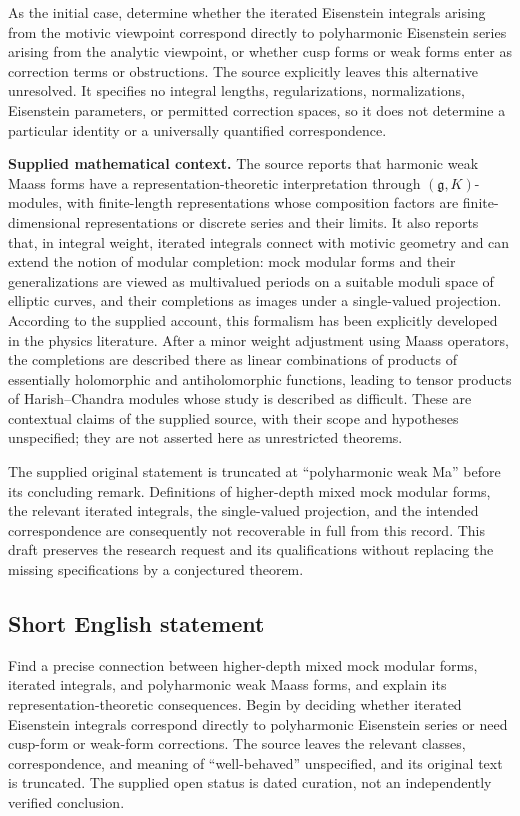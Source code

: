 \documentclass[11pt]{article}
\begin{document}
As the initial case, determine whether the iterated Eisenstein integrals arising from the motivic viewpoint correspond directly to polyharmonic Eisenstein series arising from the analytic viewpoint, or whether cusp forms or weak forms enter as correction terms or obstructions. The source explicitly leaves this alternative unresolved. It specifies no integral lengths, regularizations, normalizations, Eisenstein parameters, or permitted correction spaces, so it does not determine a particular identity or a universally quantified correspondence.

\textbf{Supplied mathematical context.} The source reports that harmonic weak Maass forms have a representation-theoretic interpretation through \((\mathfrak g,K)\)-modules, with finite-length representations whose composition factors are finite-dimensional representations or discrete series and their limits. It also reports that, in integral weight, iterated integrals connect with motivic geometry and can extend the notion of modular completion: mock modular forms and their generalizations are viewed as multivalued periods on a suitable moduli space of elliptic curves, and their completions as images under a single-valued projection. According to the supplied account, this formalism has been explicitly developed in the physics literature. After a minor weight adjustment using Maass operators, the completions are described there as linear combinations of products of essentially holomorphic and antiholomorphic functions, leading to tensor products of Harish--Chandra modules whose study is described as difficult. These are contextual claims of the supplied source, with their scope and hypotheses unspecified; they are not asserted here as unrestricted theorems.

The supplied original statement is truncated at ``polyharmonic weak Ma'' before its concluding remark. Definitions of higher-depth mixed mock modular forms, the relevant iterated integrals, the single-valued projection, and the intended correspondence are consequently not recoverable in full from this record. This draft preserves the research request and its qualifications without replacing the missing specifications by a conjectured theorem.
\subsection{Short English statement}
Find a precise connection between higher-depth mixed mock modular forms, iterated integrals, and polyharmonic weak Maass forms, and explain its representation-theoretic consequences. Begin by deciding whether iterated Eisenstein integrals correspond directly to polyharmonic Eisenstein series or need cusp-form or weak-form corrections. The source leaves the relevant classes, correspondence, and meaning of ``well-behaved'' unspecified, and its original text is truncated. The supplied open status is dated curation, not an independently verified conclusion.
\end{document}
